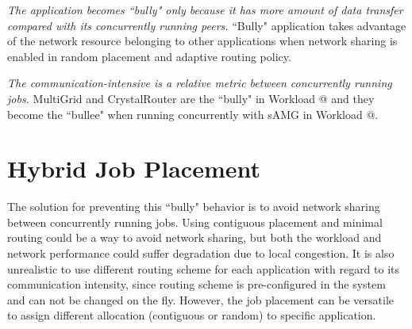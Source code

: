 \documentclass[conference,compsoc]{IEEEtran}
\makeatletter
\newcommand{\Rmnum}[1]{\expandafter\@slowromancap\romannumeral #1@}
\makeatother
\begin{document}
\emph{The application becomes ``bully" only because it has more amount of data transfer compared with its concurrently running peers.} ``Bully" application takes advantage of the network resource belonging to other applications when network sharing is enabled in random placement and adaptive routing policy. 


\emph{The communication-intensive is a relative metric between concurrently running jobs.} MultiGrid and CrystalRouter are the ``bully" in Workload \Rmnum{1} and they become the ``bullee" when running concurrently with sAMG in Workload \Rmnum{2}.


\section{Hybrid Job Placement}

The solution for preventing this ``bully" behavior is to avoid network sharing between concurrently running jobs. Using contiguous placement and minimal routing could be a way to avoid network sharing, but both the workload and network performance could suffer degradation due to local congestion. It is also unrealistic to use different routing scheme for each application with regard to its communication intensity, since routing scheme is pre-configured in the system and can not be changed on the fly. However, the job placement can be versatile to assign different allocation (contiguous or random) to specific application.
\end{document}
